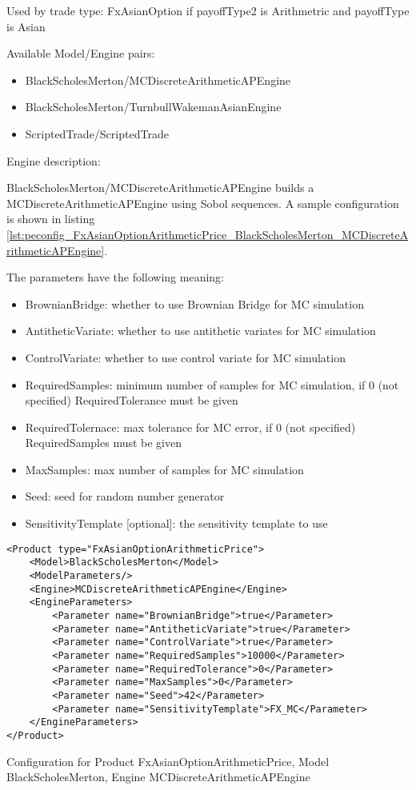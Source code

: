 Used by trade type: FxAsianOption if payoffType2 is Arithmetric and payoffType is Asian

Available Model/Engine pairs:

\begin{itemize}
  \item BlackScholesMerton/MCDiscreteArithmeticAPEngine
  \item BlackScholesMerton/TurnbullWakemanAsianEngine
  \item ScriptedTrade/ScriptedTrade
\end{itemize}

Engine description:

BlackScholesMerton/MCDiscreteArithmeticAPEngine builds a MCDiscreteArithmeticAPEngine using Sobol sequences. A sample
configuration is shown in listing
\ref{lst:peconfig_FxAsianOptionArithmeticPrice_BlackScholesMerton_MCDiscreteArithmeticAPEngine}.

The parameters have the following meaning:

\begin{itemize}
\item BrownianBridge: whether to use Brownian Bridge for MC simulation
\item AntitheticVariate: whether to use antithetic variates for MC simulation
\item ControlVariate: whether to use control variate for MC simulation
\item RequiredSamples: minimum number of samples for MC simulation, if 0 (not specified) RequiredTolerance must be given
\item RequiredTolernace: max tolerance for MC error, if 0 (not specified) RequiredSamples must be given
\item MaxSamples: max number of samples for MC simulation
\item Seed: seed for random number generator
\item SensitivityTemplate [optional]: the sensitivity template to use 
\end{itemize}

\begin{longlisting}
\begin{verbatim}
<Product type="FxAsianOptionArithmeticPrice">
    <Model>BlackScholesMerton</Model>
    <ModelParameters/>
    <Engine>MCDiscreteArithmeticAPEngine</Engine>
    <EngineParameters>
        <Parameter name="BrownianBridge">true</Parameter>    
        <Parameter name="AntitheticVariate">true</Parameter>    
        <Parameter name="ControlVariate">true</Parameter>    
        <Parameter name="RequiredSamples">10000</Parameter>    
        <Parameter name="RequiredTolerance">0</Parameter>    
        <Parameter name="MaxSamples">0</Parameter>    
        <Parameter name="Seed">42</Parameter>    
        <Parameter name="SensitivityTemplate">FX_MC</Parameter>
    </EngineParameters>
</Product>
\end{verbatim}
\caption{Configuration for Product FxAsianOptionArithmeticPrice, Model BlackScholesMerton, Engine MCDiscreteArithmeticAPEngine}
\label{lst:peconfig_FxAsianOptionArithmeticPrice_BlackScholesMerton_MCDiscreteArithmeticAPEngine}
\end{longlisting}

